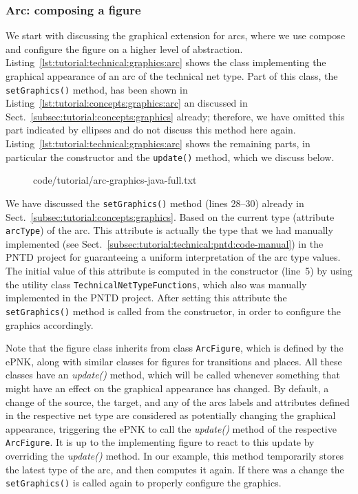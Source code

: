 \subsubsection{Arc: composing a figure}
\label{subsubsec:tutorial:technical:graphics:arc}

We start with discussing the graphical extension for arcs, where we use
compose and configure the figure on a higher level of abstraction.
Listing~\ref{lst:tutorial:technical:graphics:arc} shows the class implementing
the graphical appearance of an arc of the technical net type. Part of this 
class, the {\tt setGraphics()} method, has been shown in
Listing~\ref{lst:tutorial:concepts:graphics:arc} an discussed in
Sect.~\ref{subsec:tutorial:concepts:graphics} already; therefore, we have
omitted this part indicated by ellipses and do not discuss this method here
again. Listing~\ref{lst:tutorial:technical:graphics:arc} shows the remaining
parts, in particular the constructor and the {\tt update()} method, which we
discuss below.
%
\begin{figure}[htbp!]
%
  {code/tutorial/arc-graphics-java-full.txt}
\end{figure}
%
We have discussed the {\tt setGraphics()} method (lines 28--30) already in 
Sect.~\ref{subsec:tutorial:concepts:graphics}. Based on the current type
(attribute {\tt arcType}) of the arc. This attribute is actually the type
that we had manually implemented (see
Sect.~\ref{subsec:tutorial:technical:pntd:code-manual}) in the PNTD project for
guaranteeing a uniform interpretation of the arc type values.
The initial value of this attribute is computed in the constructor (line~5) by using the
utility class {\tt TechnicalNetTypeFunctions}, which also was manually
implemented in the PNTD project. After setting this attribute the {\tt
setGraphics()} method is called from the constructor, in order to configure the
graphics accordingly.

Note that the figure class inherits from class {\tt ArcFigure}, which is defined
by the ePNK, along with similar classes for figures for transitions and places.
All these classes have an \emph{update()} method, which will be called whenever something that
might have an effect on the graphical appearance has changed. By default, a
change of the source, the target, and any of the arcs labels and attributes
defined in the respective net type are considered as potentially changing
the graphical appearance, triggering the ePNK to call the \emph{update()}
method of the respective {\tt ArcFigure}. It is up to the implementing figure
to react to this update by overriding the \emph{update()} method. In our
example, this method temporarily stores the latest type of the arc, and
then computes it again. If there was a change the {\tt setGraphics()} is
called again to properly configure the graphics.

